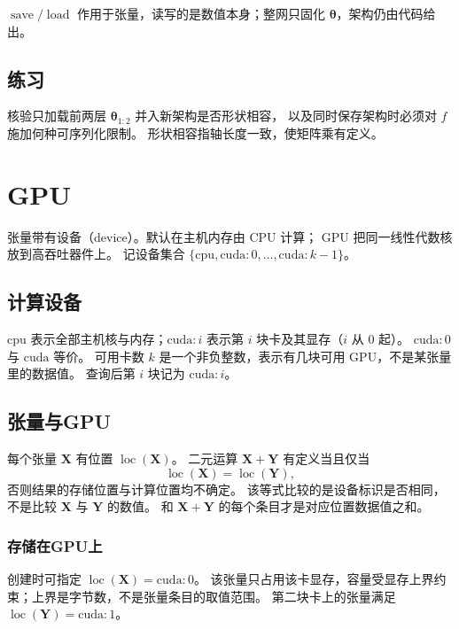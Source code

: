$\operatorname{save}/\operatorname{load}$ 作用于张量，读写的是数值本身；整网只固化 $\bm{\theta}$，架构仍由代码给出。

\subsection{练习}

核验只加载前两层 $\bm{\theta}_{1:2}$ 并入新架构是否形状相容，
以及同时保存架构时必须对 $f$ 施加何种可序列化限制。
形状相容指轴长度一致，使矩阵乘有定义。

\section{GPU}



张量带有设备（device）。默认在主机内存由 CPU 计算；
GPU 把同一线性代数核放到高吞吐器件上。
记设备集合 $\{\mathrm{cpu},\mathrm{cuda}{:}0,\ldots,\mathrm{cuda}{:}{k-1}\}$。

\subsection{计算设备}

$\mathrm{cpu}$ 表示全部主机核与内存；$\mathrm{cuda}{:}i$ 表示第 $i$ 块卡及其显存（$i$ 从 $0$ 起）。
$\mathrm{cuda}{:}0$ 与 $\mathrm{cuda}$ 等价。
可用卡数 $k$ 是一个非负整数，表示有几块可用 GPU，不是某张量里的数据值。
查询后第 $i$ 块记为 $\mathrm{cuda}{:}i$。

\subsection{张量与GPU}

每个张量 $\bm{X}$ 有位置 $\operatorname{loc}(\bm{X})$。
二元运算 $\bm{X}+\bm{Y}$ 有定义当且仅当
\[
\operatorname{loc}(\bm{X})=\operatorname{loc}(\bm{Y}),
\]
否则结果的存储位置与计算位置均不确定。
该等式比较的是设备标识是否相同，不是比较 $\bm{X}$ 与 $\bm{Y}$ 的数值。
和 $\bm{X}+\bm{Y}$ 的每个条目才是对应位置数据值之和。

\subsubsection{存储在GPU上}

创建时可指定 $\operatorname{loc}(\bm{X})=\mathrm{cuda}{:}0$。
该张量只占用该卡显存，容量受显存上界约束；上界是字节数，不是张量条目的取值范围。
第二块卡上的张量满足 $\operatorname{loc}(\bm{Y})=\mathrm{cuda}{:}1$。


